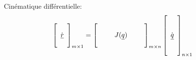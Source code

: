 Cinématique différentielle:
\begin{align}
\left[ \begin{array}{c}  \\ \dot{\underline{r}} \\ \\
\end{array} \right]_{m \times 1}
&= 
\left[ \begin{array}{c c c c c} 
&&&&\\
&& J(\underline{q}) &&\\
&&&&
\end{array} \right]_{m \times n}
\left[ \begin{array}{c} 
\\ \\ \dot{\underline{q}} \\ \\ \\
\end{array} \right]_{n \times 1}
\end{align} 


